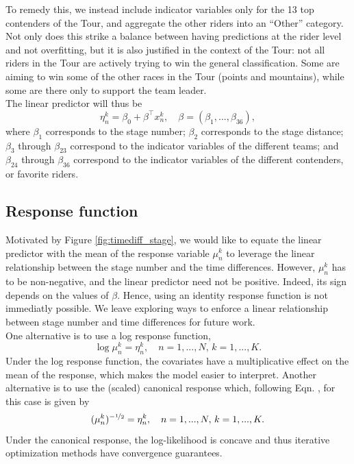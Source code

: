 \documentclass[aos,preprint]{imsart}
\begin{document}
To remedy this, we instead include indicator variables only for the 13 top contenders of the Tour, and aggregate the other riders into an ``Other'' category. Not only does this strike a balance between having predictions at the rider level and not overfitting, but it is also justified in the context of the Tour: not all riders in the Tour are actively trying to win the general classification. Some are aiming to win some of the other races in the Tour (points and mountains), while some are there only to support the team leader. \\

The linear predictor will thus be
\[
  \eta_n^k = \beta_0 + \beta^\top x_n^k, \quad \beta = (\beta_1, ..., \beta_{36}),
\]
where $\beta_1$ corresponds to the stage number; $\beta_2$ corresponds to the stage distance; $\beta_3$ through $\beta_{23}$ correspond to the indicator variables of the different teams; and $\beta_{24}$ through $\beta_{36}$ correspond to the indicator variables of the different contenders, or favorite riders.




\subsection{Response function}



Motivated by Figure \ref{fig:timediff_stage}, we would like to equate the linear predictor with the mean of the response variable $\mu_n^k$ to leverage the linear relationship between the stage number and the time differences. However, $\mu_n^k$ has to be non-negative, and the linear predictor need not be positive. Indeed, its sign depends on the values of $\beta$. Hence, using an identity response function is not immediatly possible. We leave exploring ways to enforce a linear relationship between stage number and time differences for future work. \\

One alternative is to use a log response function,
\[
  \log \mu_n^k = \eta_n^k, \quad n = 1, ..., N, \, k = 1, ..., K.
\]
Under the log response function, the covariates have a multiplicative effect on the mean of the response, which makes the model easier to interpret. Another alternative is to use the (scaled) canonical response which, following Eqn. , for this case is given by
\[
  (\mu_n^k)^{-\nicefrac{1}{2}} = \eta_n^k, \quad n = 1, ..., N, \, k = 1, ..., K.
\]
Under the canonical response, the log-likelihood is concave and thus iterative optimization methods have convergence guarantees.
\end{document}
